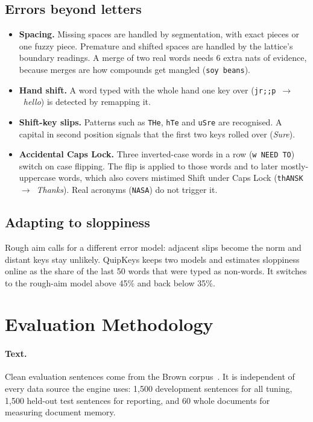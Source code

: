 \documentclass[11pt,a4paper]{article}
\newcommand{\qk}{QuipKeys}
\newcommand{\ttw}[1]{\texttt{#1}}
\begin{document}
\subsection{Errors beyond letters}
\label{sec:special}
\begin{itemize}
\item \textbf{Spacing.} Missing spaces are handled by segmentation, with exact pieces or one fuzzy piece. Premature and shifted spaces are handled by the lattice's boundary readings. A merge of two real words needs 6 extra nats of evidence, because merges are how compounds get mangled (\ttw{soy beans}).
\item \textbf{Hand shift.} A word typed with the whole hand one key over (\ttw{jr;;p}~$\to$~\emph{hello}) is detected by remapping it.
\item \textbf{Shift-key slips.} Patterns such as \ttw{THe}, \ttw{hTe} and \ttw{uSre} are recognised. A capital in second position signals that the first two keys rolled over (\emph{Sure}).
\item \textbf{Accidental Caps Lock.} Three inverted-case words in a row (\ttw{w NEED TO}) switch on case flipping. The flip is applied to those words and to later mostly-uppercase words, which also covers mistimed Shift under Caps Lock (\ttw{thANSK}~$\to$~\emph{Thanks}). Real acronyms (\ttw{NASA}) do not trigger it.
\end{itemize}

\subsection{Adapting to sloppiness}
Rough aim calls for a different error model: adjacent slips become the norm and distant keys stay unlikely. \qk{} keeps two models and estimates sloppiness online as the share of the last 50 words that were typed as non-words. It switches to the rough-aim model above 45\% and back below 35\%.

\section{Evaluation Methodology}
\label{sec:eval}

\paragraph{Text.} Clean evaluation sentences come from the Brown corpus~\citep{francis1979}. It is independent of every data source the engine uses: 1,500 development sentences for all tuning, 1,500 held-out test sentences for reporting, and 60 whole documents for measuring document memory.
\end{document}
